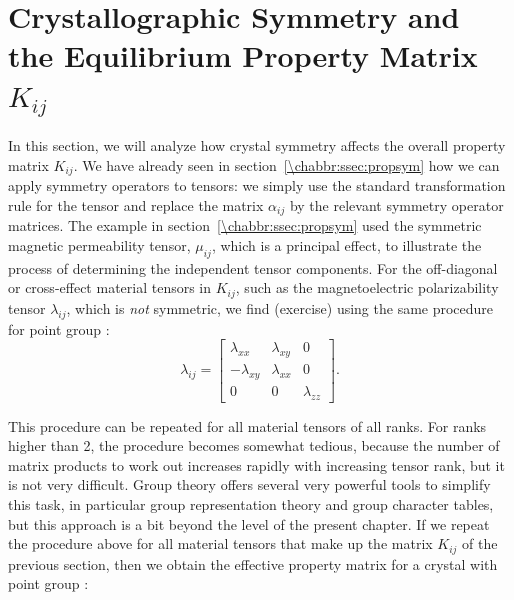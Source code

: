 \section{Crystallographic Symmetry and the Equilibrium Property Matrix $K_{ij}$}\label{\chabbr:sec:CrySymK}

In this section, we will analyze how crystal symmetry affects the overall property matrix $K_{ij}$. We have already seen in section~\ref{\chabbr:ssec:propsym} how we can apply symmetry operators to tensors: we simply use the standard transformation rule for the tensor and replace the matrix $\alpha_{ij}$ by the relevant symmetry operator matrices. The example in section~\ref{\chabbr:ssec:propsym} used the symmetric magnetic permeability tensor, $\mu_{ij}$, which is a principal effect, to illustrate the process of determining the independent tensor components.  For the off-diagonal or cross-effect material tensors in $K_{ij}$, such as the magnetoelectric polarizability tensor $\lambda_{ij}$, which is \textit{not} symmetric, we find (exercise) using the same procedure for point group :
\begin{equation}
	\lambda_{ij} =  \left[\begin{array}{ccc} 
	\lambda_{xx} & \lambda_{xy} & 0 \\ 
	-\lambda_{xy} &  \lambda_{xx} & 0 \\ 
	0 & 0 & \lambda_{zz}\end{array}\right].
\end{equation}

This procedure can be repeated for all material tensors of all ranks.  For ranks higher than 2, the procedure becomes somewhat tedious, because the number of matrix products to work out increases rapidly with increasing tensor rank, but it is not very difficult. Group theory offers several very powerful tools to simplify this task, in particular group representation theory and group character tables, but this approach is a bit beyond the level of the present chapter. If we repeat the procedure above for all material tensors that make up the matrix $K_{ij}$ of the previous section, then we obtain the effective property matrix for a crystal with point group :

